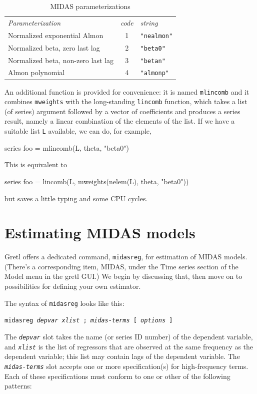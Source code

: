 \documentclass{article}
\begin{document}
\begin{table}[htbp]
  \centering
  \begin{tabular}{lcl}
    \textit{Parameterization} & 
      \textit{code} & \textit{string} \\[4pt]
    Normalized exponential Almon & 1 & \verb|"nealmon"| \\
    Normalized beta, zero last lag & 2 & \verb|"beta0"| \\
    Normalized beta, non-zero last lag & 3 & \verb|"betan"| \\
    Almon polynomial & 4 & \verb|"almonp"| \\
  \end{tabular}
  \caption{MIDAS parameterizations}
  \label{tab:midas-parm}
\end{table}

An additional function is provided for convenience: it is named
\texttt{mlincomb} and it combines \texttt{mweights} with the
long-standing \texttt{lincomb} function, which takes a list (of
series) argument followed by a vector of coefficients and produces a
series result, namely a linear combination of the elements of the
list. If we have a suitable list \texttt{L} available, we can
do, for example,
\begin{code}
series foo = mlincomb(L, theta, "beta0")
\end{code}
This is equivalent to
\begin{code}
series foo = lincomb(L, mweights(nelem(L), theta, "beta0"))
\end{code}
but saves a little typing and some CPU cycles.

\section{Estimating MIDAS models}
\label{sec:estimation}

Gretl offers a dedicated command, \texttt{midasreg}, for estimation of
MIDAS models. (There's a corresponding item, \textsf{MIDAS}, under the
\textsf{Time series} section of the \textsf{Model} menu in the gretl
GUI.) We begin by discussing that, then move on to possibilities for
defining your own estimator.

The syntax of \texttt{midasreg} looks like this:

\texttt{midasreg \textsl{depvar} \textsl{xlist} ;
\textsl{midas-terms} [ \textsl{options} ]}

The \texttt{\textsl{depvar}} slot takes the name (or series ID number)
of the dependent variable, and \texttt{\textsl{xlist}} is the list of
regressors that are observed at the same frequency as the dependent
variable; this list may contain lags of the dependent variable. The
\texttt{\textsl{midas-terms}} slot accepts one or more specification(s)
for high-frequency terms. Each of these specifications must conform to
one or other of the following patterns:
\end{document}
